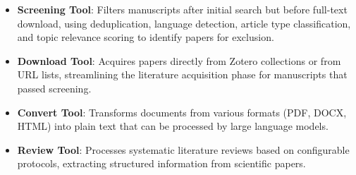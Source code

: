 \begin{itemize}
    \item \textbf{Screening Tool}: Filters manuscripts after initial search but before full-text download, using deduplication, language detection, article type classification, and topic relevance scoring to identify papers for exclusion.

    \item \textbf{Download Tool}: Acquires papers directly from Zotero collections or from URL lists, streamlining the literature acquisition phase for manuscripts that passed screening.

    \item \textbf{Convert Tool}: Transforms documents from various formats (PDF, DOCX, HTML) into plain text that can be processed by large language models.

    \item \textbf{Review Tool}: Processes systematic literature reviews based on configurable protocols, extracting structured information from scientific papers.
\end{itemize}

